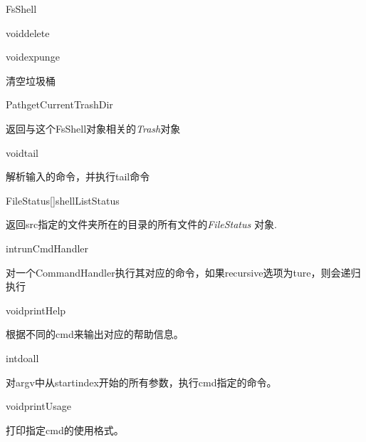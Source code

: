 \begin{XeClass}{FsShell}
\begin{XeMethod}{\XePrivate}{void}{delete}
    \end{XeMethod}

    \begin{XeMethod}{\XePrivate}{void}{expunge}
         
 清空垃圾桶

    \end{XeMethod}

    \begin{XeMethod}{\XePublic}{Path}{getCurrentTrashDir}
         
 返回与这个FsShell对象相关的\emph{Trash}对象

    \end{XeMethod}

    \begin{XeMethod}{\XePrivate}{void}{tail}
         
 解析输入的命令，并执行tail命令

    \end{XeMethod}

    \begin{XeMethod}{\XePrivate}{FileStatus[]}{shellListStatus}
         
 返回src指定的文件夹所在的目录的所有文件的\emph{FileStatus}
 对象.

    \end{XeMethod}

    \begin{XeMethod}{\XePrivate}{int}{runCmdHandler}
         
 对一个CommandHandler执行其对应的命令，如果recursive选项为ture，则会递归执行

    \end{XeMethod}

    \begin{XeMethod}{\XePrivate}{void}{printHelp}
         
 根据不同的cmd来输出对应的帮助信息。

    \end{XeMethod}

    \begin{XeMethod}{\XePrivate}{int}{doall}
         
 对argv中从startindex开始的所有参数，执行cmd指定的命令。

    \end{XeMethod}

    \begin{XeMethod}{\XePrivate}{void}{printUsage}
         
 打印指定cmd的使用格式。


\end{XeMethod}
\end{XeClass}
